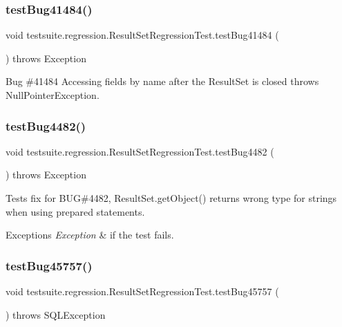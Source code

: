 \subsubsection{\texorpdfstring{test\+Bug41484()}{testBug41484()}}
{\footnotesize\ttfamily void testsuite.\+regression.\+Result\+Set\+Regression\+Test.\+test\+Bug41484 (\begin{DoxyParamCaption}{ }\end{DoxyParamCaption}) throws Exception}

Bug \#41484 Accessing fields by name after the Result\+Set is closed throws Null\+Pointer\+Exception. \mbox{\label{classtestsuite_1_1regression_1_1_result_set_regression_test_adb7d4f5375bd8e7ac8f4cc267e818fea}} 
\subsubsection{\texorpdfstring{test\+Bug4482()}{testBug4482()}}
{\footnotesize\ttfamily void testsuite.\+regression.\+Result\+Set\+Regression\+Test.\+test\+Bug4482 (\begin{DoxyParamCaption}{ }\end{DoxyParamCaption}) throws Exception}

Tests fix for B\+UG\#4482, Result\+Set.\+get\+Object() returns wrong type for strings when using prepared statements.


\begin{DoxyExceptions}{Exceptions}
{\em Exception} & if the test fails. \\
\hline
\end{DoxyExceptions}
\mbox{\label{classtestsuite_1_1regression_1_1_result_set_regression_test_a38aab06b61d59c04df60b2ffd7dd9861}} 
\subsubsection{\texorpdfstring{test\+Bug45757()}{testBug45757()}}
{\footnotesize\ttfamily void testsuite.\+regression.\+Result\+Set\+Regression\+Test.\+test\+Bug45757 (\begin{DoxyParamCaption}{ }\end{DoxyParamCaption}) throws S\+Q\+L\+Exception}

